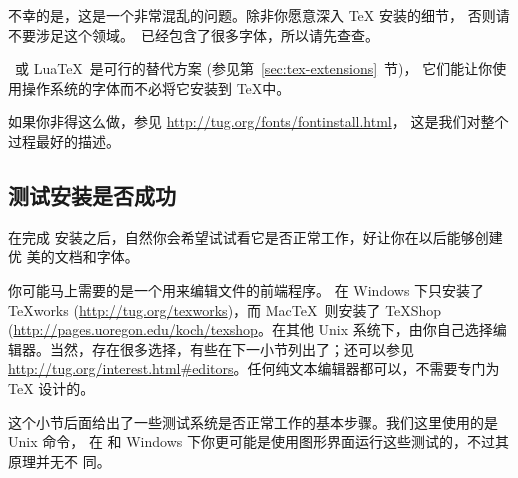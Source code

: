 \documentclass{article}
\begin{document}
不幸的是，这是一个非常混乱的问题。除非你愿意深入 \TeX{} 安装的细节，
否则请不要涉足这个领域。\TL\ 已经包含了很多字体，所以请先查查。

\XeTeX\ 或 Lua\TeX\ 是可行的替代方案 (参见第~\ref{sec:tex-extensions}~节)，
它们能让你使用操作系统的字体而不必将它安装到 \TeX 中。

如果你非得这么做，参见 \url{http://tug.org/fonts/fontinstall.html}，
这是我们对整个过程最好的描述。

\subsection{测试安装是否成功}
\label{sec:test-install}

在完成 \TL{} 安装之后，自然你会希望试试看它是否正常工作，好让你在以后能够创建优
美的文档和字体。

你可能马上需要的是一个用来编辑文件的前端程序。\TL{} 在 Windows 下只安装了
\TeX{}works (\url{http://tug.org/texworks})，而 Mac\TeX\ 则安装了 TeXShop
(\url{http://pages.uoregon.edu/koch/texshop}。在其他 Unix 系统下，由你自己选择编
辑器。当然，存在很多选择，有些在下一小节列出了；还可以参见
\url{http://tug.org/interest.html#editors}。任何纯文本编辑器都可以，不需要专门为
\TeX{} 设计的。

这个小节后面给出了一些测试系统是否正常工作的基本步骤。我们这里使用的是 Unix 命令，
在 \MacOSX{} 和 Windows 下你更可能是使用图形界面运行这些测试的，不过其原理并无不
同。
\end{document}
